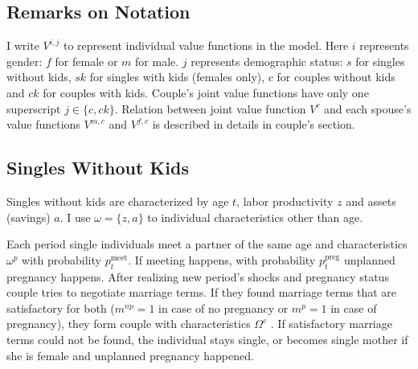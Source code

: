 \documentclass[12pt,letter]{article}
\begin{document}
\subsection{Remarks on Notation}
I write $V^{i,j}$ to represent individual value functions in the model. Here $i$ represents gender: $f$ for female or $m$ for male. $j$ represents demographic status: $s$ for singles without kids, $sk$ for singles with kids (females only), $c$ for couples without kids and $ck$ for couples with kids. Couple's joint value functions have only one superscript $j \in \{c,ck\}$. Relation between joint value function $V^{c}$ and each spouse's value functions $V^{m,c}$ and $V^{f,c}$ is described in details in couple's section.

\subsection{Singles Without Kids}
Singles without kids are characterized by age $t$, labor productivity $z$ and assets (savings) $a$. I use $\omega = \{z,a\}$ to individual characteristics other than age.

Each period single individuals meet a partner of the same age and characteristics $\omega^p$ with probability $p^{\text{meet}}_t$. If meeting happens, with probability $p^{\text{preg}}_t$ unplanned pregnancy happens. After realizing new period's shocks and pregnancy status couple tries to negotiate marriage terms. If they found marriage terms that are satisfactory for both ($m^{np} = 1$ in case of no pregnancy or $m^p = 1$ in case of pregnancy), they form couple with characteristics $\Omega^c$ . If satisfactory marriage terms could not be found, the individual stays single, or becomes single mother if she is female and unplanned pregnancy happened.
\end{document}
